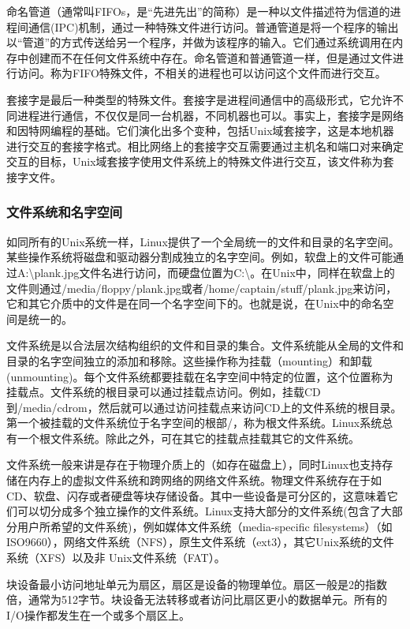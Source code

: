 命名管道（通常叫FIFOs，是“先进先出”的简称）是一种以文件描述符为信道的进程间通信(IPC)机制，通过一种特殊文件进行访问。普通管道是将一个程序的输出以“管道”的方式传送给另一个程序，并做为该程序的输入。它们通过系统调用在内存中创建而不在任何文件系统中存在。命名管道和普通管道一样，但是通过文件进行访问。称为FIFO特殊文件，不相关的进程也可以访问这个文件而进行交互。

套接字是最后一种类型的特殊文件。套接字是进程间通信中的高级形式，它允许不同进程进行通信，不仅仅是同一台机器，不同机器也可以。事实上，套接字是网络和因特网编程的基础。它们演化出多个变种，包括Unix域套接字，这是本地机器进行交互的套接字格式。相比网络上的套接字交互需要通过主机名和端口对来确定交互的目标，Unix域套接字使用文件系统上的特殊文件进行交互，该文件称为套接字文件。

\subsubsection{文件系统和名字空间}

如同所有的Unix系统一样，Linux提供了一个全局统一的文件和目录的名字空间。某些操作系统将磁盘和驱动器分割成独立的名字空间。例如，软盘上的文件可能通过A:\textbackslash plank.jpg文件名进行访问，而硬盘位置为C:\textbackslash。在Unix中，同样在软盘上的文件则通过/media/floppy/plank.jpg或者/home/captain/stuff/plank.jpg来访问，它和其它介质中的文件是在同一个名字空间下的。也就是说，在Unix中的命名空间是统一的。

文件系统是以合法层次结构组织的文件和目录的集合。文件系统能从全局的文件和目录的名字空间独立的添加和移除。这些操作称为挂载（mounting）和卸载(unmounting)。每个文件系统都要挂载在名字空间中特定的位置，这个位置称为挂载点。文件系统的根目录可以通过挂载点访问。例如，挂载CD到/media/cdrom，然后就可以通过访问挂载点来访问CD上的文件系统的根目录。第一个被挂载的文件系统位于名字空间的根部/，称为根文件系统。Linux系统总有一个根文件系统。除此之外，可在其它的挂载点挂载其它的文件系统。

文件系统一般来讲是存在于物理介质上的（如存在磁盘上），同时Linux也支持存储在内存上的虚拟文件系统和跨网络的网络文件系统。物理文件系统存在于如CD、软盘、闪存或者硬盘等块存储设备。其中一些设备是可分区的，这意味着它们可以切分成多个独立操作的文件系统。Linux支持大部分的文件系统(包含了大部分用户所希望的文件系统)，例如媒体文件系统（media-specific filesystems）（如ISO9660），网络文件系统（NFS），原生文件系统（ext3），其它Unix系统的文件系统（XFS）以及非 Unix文件系统（FAT）。

块设备最小访问地址单元为扇区，扇区是设备的物理单位。扇区一般是2的指数倍，通常为512字节。块设备无法转移或者访问比扇区更小的数据单元。所有的I/O操作都发生在一个或多个扇区上。

